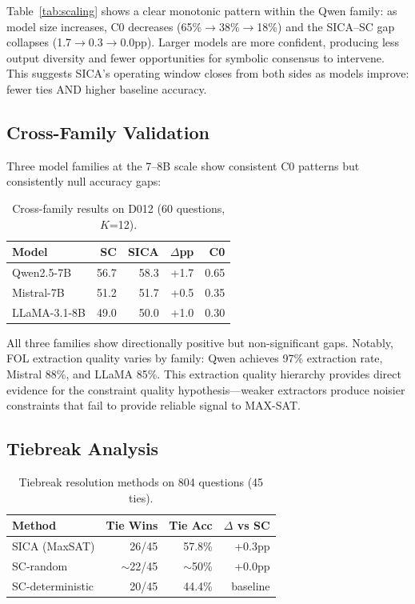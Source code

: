 \documentclass[11pt,a4paper]{article}
\begin{document}
Table~\ref{tab:scaling} shows a clear monotonic pattern within the Qwen family: as model size increases, C0 decreases (65\%$\rightarrow$38\%$\rightarrow$18\%) and the SICA--SC gap collapses (1.7$\rightarrow$0.3$\rightarrow$0.0pp). Larger models are more confident, producing less output diversity and fewer opportunities for symbolic consensus to intervene. This suggests SICA's operating window closes from both sides as models improve: fewer ties AND higher baseline accuracy.

\subsection{Cross-Family Validation}

Three model families at the 7--8B scale show consistent C0 patterns but consistently null accuracy gaps:

\begin{table}[t]
\centering
\small
\caption{Cross-family results on D012 (60 questions, $K$=12).}
\label{tab:crossfamily}
\begin{tabular}{lrrrr}
\toprule
\textbf{Model} & \textbf{SC} & \textbf{SICA} & \textbf{$\Delta$pp} & \textbf{C0} \\
\midrule
Qwen2.5-7B & 56.7 & 58.3 & +1.7 & 0.65 \\
Mistral-7B & 51.2 & 51.7 & +0.5 & 0.35 \\
LLaMA-3.1-8B & 49.0 & 50.0 & +1.0 & 0.30 \\
\bottomrule
\end{tabular}
\end{table}

All three families show directionally positive but non-significant gaps. Notably, FOL extraction quality varies by family: Qwen achieves 97\% extraction rate, Mistral 88\%, and LLaMA 85\%. This extraction quality hierarchy provides direct evidence for the constraint quality hypothesis---weaker extractors produce noisier constraints that fail to provide reliable signal to MAX-SAT.

\subsection{Tiebreak Analysis}

\begin{table}[t]
\centering
\small
\caption{Tiebreak resolution methods on 804 questions (45 ties).}
\label{tab:tiebreak}
\begin{tabular}{lrrr}
\toprule
\textbf{Method} & \textbf{Tie Wins} & \textbf{Tie Acc} & \textbf{$\Delta$ vs SC} \\
\midrule
SICA (MaxSAT) & 26/45 & 57.8\% & +0.3pp \\
SC-random & $\sim$22/45 & $\sim$50\% & +0.0pp \\
SC-deterministic & 20/45 & 44.4\% & baseline \\
\bottomrule
\end{tabular}
\end{table}
\end{document}
